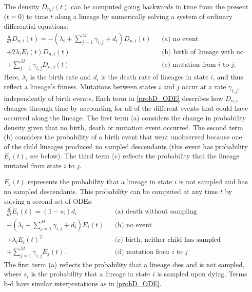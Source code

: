 \documentclass[10pt]{article}
\begin{document}
The density $D_{n,i}(t)$ can be computed going backwards in time from the present ($t=0$) to time $t$ along a lineage by numerically solving a system of ordinary differential equations:
\begin{eqnarray} \label{probD_ODE}
	\frac{d}{dt} D_{n,i}(t) = 
	-(\lambda_{i} + \sum_{j=1}^{M} \gamma_{i,j} + d_{i}) D_{n,i}(t) & & \text{(a) no event} \nonumber \\
	+ 2 \lambda_{i} E_{i}(t) D_{n,i}(t) & & \text{(b) birth of lineage with no sampled descendants} \\
	+ \sum_{j=1}^{M} \gamma_{i,j} D_{n,j}(t) & & \text{(c) mutation from $i$ to $j$}. \nonumber
\end{eqnarray}  
Here, $\lambda_{i}$ is the birth rate and $d_{i}$ is the death rate of lineages in state $i$, and thus reflect a lineage's fitness. Mutations between states $i$ and $j$ occur at a rate $\gamma_{i,j}$, independently of birth events. Each term in \eqref{probD_ODE} describes how $D_{n,i}$ changes through time by accounting for all of the different events that could have occurred along the lineage. The first term (a) considers the change in probability density given that no birth, death or mutation event occurred. The second term (b) considers the probability of a birth event that went unobserved because one of the child lineages produced no sampled descendants (this event has probability $E_{i}(t)$, see below). The third term (c) reflects the probability that the lineage mutated from state $i$ to $j$.

$E_{i}(t)$ represents the probability that a lineage in state $i$ is not sampled and has no sampled descendants. This probability can be computed at any time $t$ by solving a second set of ODEs:
\begin{eqnarray} \label{probE_ODE}
	\frac{d}{dt} E_{i}(t) = 
	(1 - s_{i}) d_{i} & & \text{(a) death without sampling} \nonumber \\
	- (\lambda_{i} + \sum_{j=1}^{M} \gamma_{i,j} + d_{i}) E_{i}(t) & & \text{(b) no event} \\
	+ \lambda_{i} E_{i}(t)^{2} & & \text{(c) birth, neither child has sampled descendants} \nonumber \\
	+ \sum_{j=1}^{M} \gamma_{i,j} E_{j}(t). & & \text{(d) mutation from $i$ to $j$} \nonumber
\end{eqnarray}
The first term (a) reflects the probability that a lineage dies and is not sampled, where $s_{i}$ is the probability that a lineage in state $i$ is sampled upon dying. Terms b-d have similar interpretations as in \eqref{probD_ODE}. 
\end{document}
